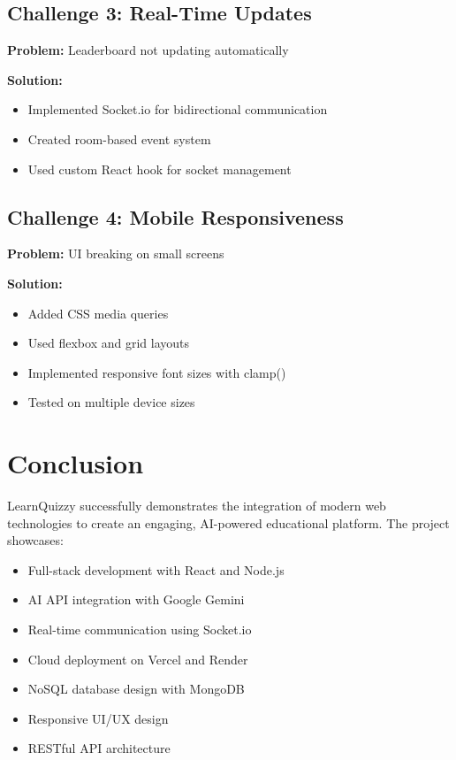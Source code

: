 \documentclass[12pt,a4paper]{article}
\begin{document}
\subsection{Challenge 3: Real-Time Updates}
\textbf{Problem:} Leaderboard not updating automatically

\textbf{Solution:}
\begin{itemize}
    \item Implemented Socket.io for bidirectional communication
    \item Created room-based event system
    \item Used custom React hook for socket management
\end{itemize}

\subsection{Challenge 4: Mobile Responsiveness}
\textbf{Problem:} UI breaking on small screens

\textbf{Solution:}
\begin{itemize}
    \item Added CSS media queries
    \item Used flexbox and grid layouts
    \item Implemented responsive font sizes with clamp()
    \item Tested on multiple device sizes
\end{itemize}

\newpage

\section{Conclusion}

LearnQuizzy successfully demonstrates the integration of modern web technologies to create an engaging, AI-powered educational platform. The project showcases:

\begin{itemize}
    \item Full-stack development with React and Node.js
    \item AI API integration with Google Gemini
    \item Real-time communication using Socket.io
    \item Cloud deployment on Vercel and Render
    \item NoSQL database design with MongoDB
    \item Responsive UI/UX design
    \item RESTful API architecture
\end{itemize}
\end{document}
